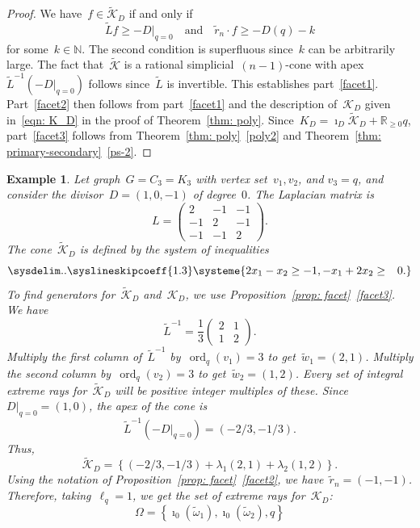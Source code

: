 \documentclass{amsart}
\newtheorem{Example}[thm]{Example}
\newenvironment{example}
  {\begin{Example}\rm}{\end{Example}}
\DeclareMathOperator{\ord}{ord}
\newcommand{\R}{\mathbb{R}}
\newcommand{\N}{\mathbb{N}}
\newcommand{\tL}{\tilde{L}}
\newcommand{\tl}{\ell}
\newcommand{\K}{\mathcal{K}}
\newcommand{\tK}{\widetilde{\mathcal{K}}}
\begin{document}
\begin{proof}  We have~$f\in\tK_D$ if and only if
  \[
    \tL f\geq-D|_{q=0}\quad\text{and}\quad \tilde{r}_n\cdot f\geq -D(q)-k
  \]
  for some~$k\in\N$.  The second condition is superfluous since~$k$ can
  be arbitrarily large.  The fact that~$\tK$ is a rational
  simplicial~$(n-1)$-cone with apex~$\tL^{-1}(-D|_{q=0})$ follows since~$\tL$ is 
  invertible.  This establishes part~\ref{facet1}.
  Part~\ref{facet2} then follows from part~\ref{facet1} and the description
  of~$\K_D$ given in~\eqref{eqn: K_D} in the proof of Theorem~\ref{thm: poly}.
  Since~$K_D=\imath_D{\tK_D}+\R_{\geq0}q$, part~\ref{facet3} follows from
  Theorem~\ref{thm: poly}~\ref{poly2} and Theorem~\ref{thm:
  primary-secondary}~\ref{ps-2}.
\end{proof}

\begin{example}\label{example: cone} Let graph~$G=C_3=K_3$ with vertex set~$v_1,v_2$, and $v_3=q$,
  and consider the divisor~$D=(1,0,-1)$ of degree~$0$.
  The Laplacian matrix is
  \[
L=
\left(\begin{array}{rrr}
    2&-1&-1\\
    -1&2&-1\\
    -1&-1&2
\end{array} \right).
  \]
  The cone~$\tK_D$ is defined by the system of inequalities
  \begin{equation*}
    \sysdelim..
    \syslineskipcoeff{1.3}
    \systeme{
      2x_1-x_2\geq-1,
      -x_1+2x_2\geq\hphantom{-}0.
    }
  \end{equation*}
To find generators for~$\tK_D$ and~$\K_D$, we use Proposition~\ref{prop:
facet}~\ref{facet3}.  We have
  \[
    \tL^{-1}=
	\frac{1}{3}
    \left(\begin{array}{cc}
	2&1\\
	1&2
    \end{array} \right).
  \]
  Multiply the first column of~$\tL^{-1}$ by~$\ord_q(v_1)=3$ to
  get~$\tilde{w}_1=(2,1)$.  Multiply the second column by~$\ord_q(v_2)=3$ to
  get~$\tilde{w}_2=(1,2)$.  Every set of integral extreme rays for~$\tK_D$ will be positive integer
  multiples of these.  Since~$D|_{q=0}=(1,0)$, the apex of the cone is
  \[
    \tL^{-1}(-D|_{q=0})=(-2/3,-1/3).
  \]
  Thus, 
  \[
    \tK_D=\left\{ (-2/3,-1/3)+\lambda_1(2,1)+\lambda_2(1,2) \right\}.
  \]
  Using the notation of Proposition~\ref{prop: facet}~\ref{facet2}, we
  have~$\tilde{r}_n=(-1,-1)$.  Therefore, taking~$\tl_q=1$, we get the set of
  extreme rays for~$\K_D$:
  \[
    \Omega=\left\{\imath_0(\tilde{\omega}_1),\imath_0(\tilde{\omega}_2),q \right\}
\]
\end{example}
\end{document}
